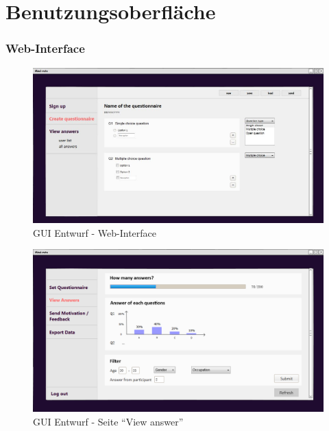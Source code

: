 \documentclass[a4paper]{scrreprt}
\begin{document}
    \chapter{Benutzungsoberfläche}
        \subsection{Web-Interface}
            \begin{figure}[ht]
                \centering
                \includegraphics[scale = 0.4]{web.jpg}
                \caption{GUI Entwurf - Web-Interface}
            \end{figure}

            \begin{figure}[ht]
                \centering
                \includegraphics[scale=0.25]{web_ViewAnswer.png}
                \caption{GUI Entwurf - Seite ``View answer''}
                \label{web_ViewAnswer}
            \end{figure}
	
\end{document}
